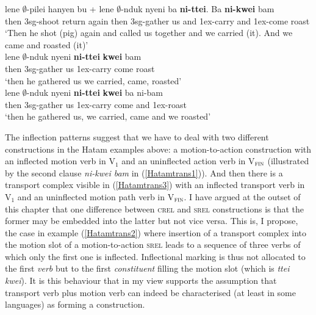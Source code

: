 \pex \label{Hatamtrans}
\a \label{Hatamtrans1}
\gll lene $\emptyset$-pilei hanyen bu + lene $\emptyset$-nduk nyeni ba \textbf{ni-ttei}. Ba \textbf{ni-kwei} bam \\
then \acs{3}\acs{sg}-shoot return again then \acs{3}\acs{sg}-gather us and \acs{1}\acs{ex}-carry and \acs{1}\acs{ex}-come roast \\
\glft `Then he shot (pig) again and called us together and we carried (it). And we came and roasted (it)' \\
\z
\a \label{Hatamtrans2}
\gll lene $\emptyset$-nduk nyeni \textbf{ni-ttei} \textbf{kwei} bam \\ 
then \acs{3}\acs{sg}-gather us \acs{1}\acs{ex}-carry come roast \\
\glft `then he gathered us we carried, came, roasted' \\ 
\z
\a \label{Hatamtrans3}
\gll lene $\emptyset$-nduk nyeni \textbf{ni-ttei} \textbf{kwei} ba ni-bam \\ 
then \acs{3}\acs{sg}-gather us \acs{1}\acs{ex}-carry come and \acs{1}\acs{ex}-roast \\
\glft `then he gathered us, we carried, came and we roasted' \\ 
\z
\xe

The inflection patterns suggest that we have to deal with two different constructions in the Hatam examples above: a motion-to-action construction with an inflected motion verb in V$_{1}$ and an uninflected action verb in V$_{\textsc{fin}}$ (illustrated by the second clause \textit{ni-kwei bam} in (\ref{Hatamtrans1})). And then there is a transport complex visible in (\ref{Hatamtrans3}) with an inflected transport verb in V$_{1}$ and an uninflected motion path verb in V$_{\textsc{fin}}$. I have argued at the outset of this chapter that one difference between \textsc{crel} and \textsc{srel} constructions is that the former may be embedded into the latter but not vice versa. This is, I propose, the case in example (\ref{Hatamtrans2}) where insertion of a transport complex into the motion slot of a motion-to-action \textsc{srel} leads to a sequence of three verbs of which only the first one is inflected. Inflectional marking is thus not allocated to the first \emph{verb} but to the first \emph{constituent} filling the motion slot (which is \textit{ttei kwei}). It is this behaviour that in my view supports the assumption that transport verb plus motion verb can indeed be characterised (at least in some languages) as forming a construction.

